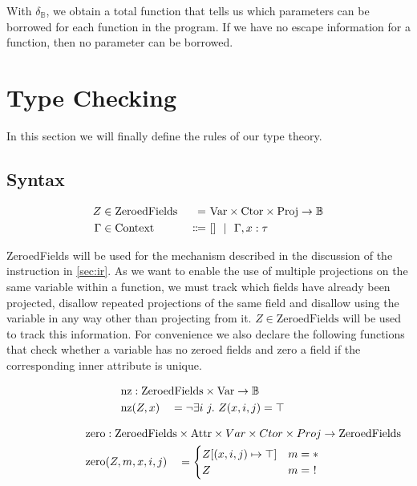 With $\delta_\mathbb{B}$, we obtain a total function that tells us which parameters can be borrowed for each function in the program. If we have no escape information for a function, then no parameter can be borrowed.

\section{Type Checking}\label{sec:checking}

In this section we will finally define the rules of our type theory.

\subsection{Syntax}

\newcommand{\ZeroedFields}{\mathrm{ZeroedFields}}
\newcommand{\Context}{\mathrm{Context}}

\begin{alignat*}{3}
	Z &\in \ZeroedFields\ &=&\ \Var \times \Ctor \times \Proj \to \mathbb{B} \\
	\Gamma &\in \Context  &\Coloneqq&\ [] \sep \Gamma, x : \tau
\end{alignat*}

ZeroedFields will be used for the mechanism described in the discussion of the  instruction in \cref{sec:ir}. As we want to enable the use of multiple projections on the same variable within a function, we must track which fields have already been projected, disallow repeated projections of the same field and disallow using the variable in any way other than projecting from it. $Z \in \ZeroedFields$ will be used to track this information. For convenience we also declare the following functions that check whether a variable has no zeroed fields and zero a field if the corresponding inner attribute is unique. 

\newcommand{\nz}{\mathrm{nz}}

\begin{alignat*}{3}
	\nz &: \mathrlap{\ZeroedFields \times \Var \to \mathbb{B}} \\
	\nz&(Z, x) &&= \lnot \exists i\ j.\ Z(x, i, j) = \top
\end{alignat*}

\newcommand{\zeroo}{\mathrm{zero}}

\begin{alignat*}{3}
	\zeroo &: \mathrlap{\ZeroedFields \times \Attr \times Var \times Ctor \times Proj \to \ZeroedFields} \\
	\zeroo&(Z, m, x, i, j) &&= \begin{cases}
		Z[(x, i, j) \mapsto \top] & m = * \\
		Z & m =\ !
	\end{cases}
\end{alignat*}

